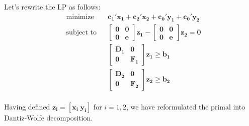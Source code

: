 \documentclass{article}
\begin{document}
\noindent
Let's rewrite the LP as follows: 
\begin{equation*}
\begin{aligned}
& \text{minimize} && \mathbf{c_1' x_1 + c_2' x_2 + c_0' y_1 + c_0' y_2} \\
& \text{subject to} && \mathbf{\begin{bmatrix} \mathbf{0} & \mathbf{0} \\ 
\mathbf{0} & \mathbf{e}
\end{bmatrix} z_1 - \begin{bmatrix} \mathbf{0} & \mathbf{0} \\ 
\mathbf{0} & \mathbf{e}
\end{bmatrix} z_2 = 0} \\
&&&  \begin{bmatrix} \mathbf{D_1} & \mathbf{0} \\ 
\mathbf{0} & \mathbf{F_1}
\end{bmatrix} \mathbf{z_1 \geq b_1} \\
&&&  \begin{bmatrix} \mathbf{D_2} & \mathbf{0} \\ 
\mathbf{0} & \mathbf{F_2}
\end{bmatrix} \mathbf{z_2 \geq b_2} \\
\end{aligned}
\end{equation*}

\noindent
Having defined $\mathbf{z_i = [x_i \; y_i]}$ for $i = 1,2$, we have reformulated the primal into Dantiz-Wolfe decomposition.  
\end{document}
